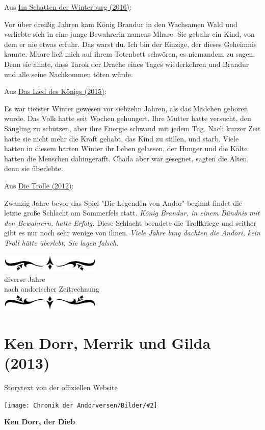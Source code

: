 \documentclass[10pt, a4paper, oneside]{book}
\newcommand{\fillbreak}{\vspace*{\fill}\columnbreak}
\newcommand{\storytext}[1]{%
    \section{#1}%
    \label{Storytext: #1}%
}
\newcommand{\reflegende}[1]{\hyperref[Legende: #1]{#1}}
\newcommand{\refprodukt}[1]{\hyperref[Produkt: #1]{#1}}
\newcommand{\refstorytext}[1]{\hyperref[Storytext: #1]{#1}}
\newcommand{\bildmitts}[2][height=0.32\textwidth,width=0.48\textwidth,keepaspectratio]{%
    \begin{center}
        \texttt{[image: Chronik der Andorversen/Bilder/\#2]}
    \end{center}
}
\newcommand{\az}[1]{%
    \begin{center}
        \includegraphics[width=180px]{Chronik der Andorversen/verzierung1.png}\\
        {\Huge #1} \\
        {nach andorischer Zeitrechnung}\\
        \includegraphics[width=180px]{Chronik der Andorversen/verzierung2.png}
    \end{center}
    \extramarks{}{#1 a.Z.}
}
\begin{document}
\begin{multicols}{2}
\begin{center}
    Aus \reflegende{Im Schatten der Winterburg (2016)}:
\end{center}

Vor über dreißig Jahren kam König Brandur in den Wachsamen Wald und verliebte sich in eine junge Bewahrerin namens Mhare. Sie gebahr ein Kind, von dem er nie etwas erfuhr. Das warst du. Ich bin der Einzige, der dieses Geheimnis kannte. Mhare ließ mich auf ihrem Totenbett schwören, es niemandem zu sagen. Denn sie ahnte, dass Tarok der Drache eines Tages wiederkehren und Brandur und alle seine Nachkommen töten würde.

\begin{center}
    Aus \refprodukt{Das Lied des Königs (2015)}:
\end{center}

Es war tiefster Winter gewesen vor siebzehn Jahren, als das Mädchen geboren wurde. Das Volk hatte seit Wochen gehungert. Ihre Mutter hatte versucht, den Säugling zu schützen, aber ihre Energie schwand mit jedem Tag. Nach kurzer Zeit hatte sie nicht mehr die Kraft gehabt, das Kind zu stillen, und starb. Viele hatten in diesem harten Winter ihr Leben gelassen, der Hunger und die Kälte hatten die Menschen dahingerafft. Chada aber war gesegnet, sagten die Alten, denn sie überlebte.



\begin{center}
    Aus \refstorytext{Die Trolle (2012)}:
\end{center}


Zwanzig Jahre bevor das Spiel "Die Legenden von Andor" beginnt findet die letzte große Schlacht am Sommerfels statt. \textit{König Brandur, in einem Bündnis mit den Bewahrern, hatte Erfolg.} Diese Schlacht beendete die Trollkriege und seither gibt es nur noch sehr wenige von ihnen. \textit{Viele Jahre lang dachten die Andori, kein Troll hätte überlebt. Sie lagen falsch.}\bigskip




\fillbreak
\az{diverse Jahre}
\storytext{Ken Dorr, Merrik und Gilda (2013)}

\begin{center}
    Storytext von der offiziellen Website
\end{center}

\bildmitts{Ken Dorr, Merrik und Gilda Bild 1.jpg}

\textbf{Ken Dorr,  der Dieb}


\end{multicols}
\end{document}
